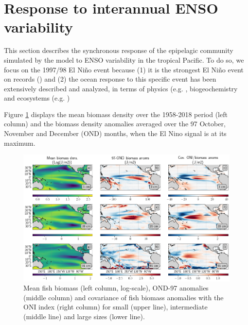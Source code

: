 \section{Response to interannual ENSO variability}

This section describes the synchronous response of the epipelagic community simulated by the model to ENSO variability in the tropical Pacific. To do so, we focus on the 1997/98 El Niño event because (1) it is the strongest El Niño event on records (\cite{santosoDefiningCharacteristicsENSO2017}) and (2) the ocean response to this specific event has been extensively described and analyzed, in terms of physics  (e.g. \cite{mcphadenGenesisEvolution1997981999, vialardModelStudyOceanic2001, lengaigneOceanResponseMarch2002}, biogeochemistry \citep{chavezBiologicalChemicalResponse1999a, gierachBiologicalResponse19972012} and ecosystems (e.g. \cite{leaObservationsFishesAssociated2000, glynnCoralBleachingMortality2001,arcosJackMackerelFishery2001})

Figure \ref{fig:mean_ond97_ape} displays the mean biomass density over the 1958-2018 period (left column) and the biomass density anomalies averaged over the 97 October, November and December (OND) months, when the El Nino signal is at its maximum.

\begin{figure}
	\centering
	\includegraphics[scale=0.4]{figs/map_mean_anom_OND_97.png}	
	\caption{Mean fish biomass (left column, log-scale), OND-97 anomalies (middle column) and covariance of fish biomass anomalies with the ONI index (right column) for small (upper line), intermediate (middle line) and large sizes (lower line).}	
	\label{fig:mean_ond97_ape}
\end{figure}

